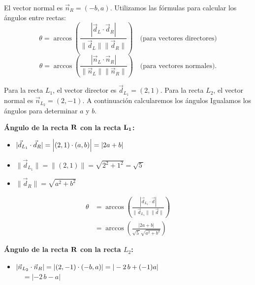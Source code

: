 \documentclass[11pt]{article}
\begin{document}
\begin{enumerate}[\hspace{-5mm} 1) ]
\begin{enumerate}[(a)]
El vector normal  es $\vec{n}_{R} =(-b, a)$. Utilizamos las fórmulas para calcular los ángulos entre rectas:
\[ \theta = \arccos\left( \frac{|\vec{d}_L \cdot \vec{d}_R|}{\|\vec{d}_L\| \|\vec{d}_R\|} \right) \quad \text{(para vectores directores)} \]
\[ \theta = \arccos\left( \frac{|\vec{n}_L \cdot \vec{n}_R|}{\|\vec{n}_L\| \|\vec{n}_R\|} \right) \quad \text{(para vectores normales)}. \]

Para la recta $L_1$, el vector director es $\vec{d}_{L_1} = (2, 1)$. Para la recta $L_2$, el vector normal es $\vec{n}_{L_2} = (2, -1)$. A continuación calcularemos los ángulos Igualamos los ángulos para determinar $a$ y $b$.



\begin{minipage}{.4\textwidth}
    

\textbf{Ángulo de la recta $\bf R$ con la recta $\bf L_1$:} 

\begin{itemize}
    \item $|\vec{d}_{L_1} \cdot \vec{d}_R|= \left| (2,1)  \cdot (a,b) \rule{0mm}{3.9mm}\right| =|2a + b|$

    \item $ \|\vec{d}_{L_1}\|   = \|(2,1) \| =  \sqrt{2^2 + 1^2} = \sqrt{ 5\,}$

    \item $\|\vec{d}_R  \| = \sqrt{a^2 + b^2} $

    
\end{itemize}



\begin{align*}
    \theta &= \arccos\left( \frac{|\vec{d}_{L_1} \cdot \vec{d}|}{\|\vec{d}_{L_1}\| \|\vec{d}\|} \right) 
    \\[2mm]
    &= \arccos\left( \frac{|2a + b|}{\sqrt{5\,} \sqrt{a^2 + b^2}}  \right) 
\end{align*}


   \end{minipage}\qquad\qquad \begin{minipage}{.53\textwidth}
    

\textbf{Ángulo  de la recta $\bf R$ con la recta $L_2$:} 

\begin{itemize}
    \item $|\vec{n}_{L_2} \cdot \vec{n}_R|= | (2,-1)\cdot (-b,a) \rule{0mm}{3.9mm}|=|-2 \, b + (-1)a|$ \\  \, \qquad \, $= |-2 \, b -a|  $


\end{itemize}
\end{minipage}
\end{enumerate}
\end{enumerate}
\end{document}
